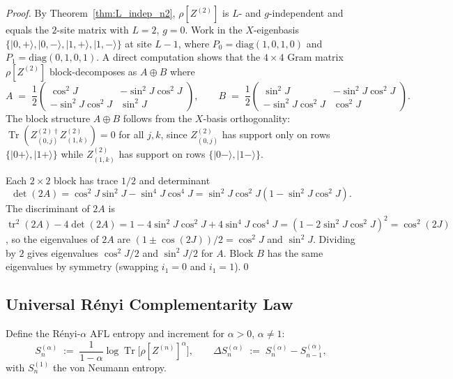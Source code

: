 \documentclass[12pt,a4paper]{article}
\begin{document}
\begin{proof}
By Theorem~\ref{thm:L_indep_n2}, $\rho[Z^{(2)}]$ is $L$- and $g$-independent
and equals the $2$-site matrix with $L=2$, $g=0$.
Work in the $X$-eigenbasis $\{|0,+\rangle,|0,-\rangle,|1,+\rangle,|1,-\rangle\}$
at site $L-1$, where $P_0 = \mathrm{diag}(1,0,1,0)$ and
$P_1 = \mathrm{diag}(0,1,0,1)$.
A direct computation shows that the $4\times 4$ Gram matrix $\rho[Z^{(2)}]$
block-decomposes as $A\oplus B$ where
\begin{equation}\label{eq:rho2_blocks}
  A \;=\; \frac{1}{2}\begin{pmatrix}\cos^2\!J & -\sin^2\!J\cos^2\!J\\-\sin^2\!J\cos^2\!J & \sin^2\!J\end{pmatrix},
  \qquad
  B \;=\; \frac{1}{2}\begin{pmatrix}\sin^2\!J & -\sin^2\!J\cos^2\!J\\-\sin^2\!J\cos^2\!J & \cos^2\!J\end{pmatrix}.
\end{equation}
The block structure $A\oplus B$ follows from the $X$-basis orthogonality:
$\operatorname{Tr}(Z^{(2)\dagger}_{(0,j)} Z^{(2)}_{(1,k)}) = 0$ for all $j,k$,
since $Z^{(2)}_{(0,j)}$ has support only on rows $\{|0+\rangle,|1+\rangle\}$
while $Z^{(2)}_{(1,k)}$ has support on rows $\{|0-\rangle,|1-\rangle\}$.

Each $2\times 2$ block has trace $1/2$ and determinant
\[
  \det(2A) = \cos^2\!J\sin^2\!J - \sin^4\!J\cos^4\!J
  = \sin^2\!J\cos^2\!J(1-\sin^2\!J\cos^2\!J).
\]
The discriminant of $2A$ is $\operatorname{tr}^2(2A) - 4\det(2A) = 1 - 4\sin^2\!J\cos^2\!J + 4\sin^4\!J\cos^4\!J = (1-2\sin^2\!J\cos^2\!J)^2 = \cos^2(2J)$,
so the eigenvalues of $2A$ are $(1\pm\cos(2J))/2 = \cos^2\!J$ and $\sin^2\!J$.
Dividing by $2$ gives eigenvalues $\cos^2\!J/2$ and $\sin^2\!J/2$ for $A$.
Block $B$ has the same eigenvalues by symmetry (swapping $i_1=0$ and $i_1=1$).\qed
\end{proof}

\subsection{Universal Rényi Complementarity Law}

Define the Rényi-$\alpha$ AFL entropy and increment for $\alpha>0$, $\alpha\ne 1$:
\[
  S^{(\alpha)}_n \;:=\; \frac{1}{1-\alpha}\log\operatorname{Tr}\!\bigl[\rho[Z^{(n)}]^\alpha\bigr],
  \qquad
  \Delta S^{(\alpha)}_n \;:=\; S^{(\alpha)}_n - S^{(\alpha)}_{n-1},
\]
with $S^{(1)}_n$ the von Neumann entropy.
\end{document}
